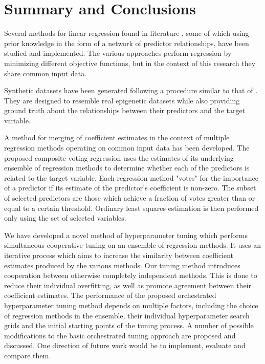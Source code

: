 \chapter{Summary and Conclusions}
Several methods for linear regression found in literature \cite{tibshirani1996regression,zou2005regularization,li2008network,li2010variable,pan2010incorporating,luo2012two,kim2013network}, some of which using prior knowledge in the form of a network of predictor relationships, have been studied and implemented. The various approaches perform regression by minimizing different objective functions, but in the context of this research they share common input data.

Synthetic datasets have been generated following a procedure similar to that of \cite{li2008network}. They are designed to resemble real epigenetic datasets while also providing ground truth about the relationships between their predictors and the target variable.

A method for merging of coefficient estimates in the context of multiple regression methods operating on common input data has been developed. The proposed composite voting regression uses the estimates of its underlying ensemble of regression methods to determine whether each of the predictors is related to the target variable. Each regression method "votes" for the importance of a predictor if its estimate of the predictor's coefficient is non-zero. The subset of selected predictors are those which achieve a fraction of votes greater than or equal to a certain threshold. Ordinary least squares estimation is then performed only using the set of selected variables.

We have developed a novel method of hyperparameter tuning which performs simultaneous cooperative tuning on an ensemble of regression methods. It uses an iterative process which aims to increase the similarity between coefficient estimates produced by the various methods. Our tuning method introduces cooperation between otherwise completely independent methods. This is done to reduce their individual overfitting, as well as promote agreement between their coefficient estimates. The performance of the proposed orchestrated hyperparameter tuning method depends on multiple factors, including the choice of regression methods in the ensemble, their individual hyperparameter search grids and the initial starting points of the tuning process. A number of possible modifications to the basic orchestrated tuning approach are proposed and discussed. One direction of future work would be to implement, evaluate and compare them.


